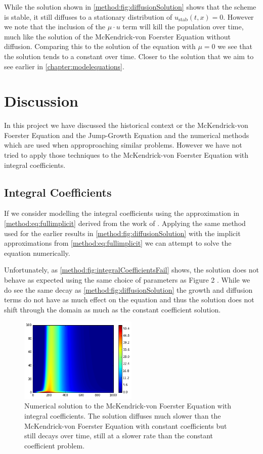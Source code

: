 \documentclass[../main.tex]{subfiles}
\begin{document}
  While the solution shown in \autoref{method:fig:diffusionSolution} shows that the scheme is stable, it still diffuses to a stationary distribution of $u_{\mathrm{stab}}(t, x) = 0$. However we note that the inclusion of the $\mu \cdot u$ term will kill the population over time, much like the solution of the McKendrick-von Foerster Equation without diffusion. Comparing this to the solution of the equation with $\mu = 0$ we see that the solution tends to a constant over time. Closer to the solution that we aim to see earlier in \autoref{chapter:modelequations}.

  \chapter{Discussion}

  In this project we have discussed the historical context or the McKendrick-von Foerster Equation and the Jump-Growth Equation and the numerical methods which are used when approproaching similar problems. However we have not tried to apply those techniques to the McKendrick-von Foerster Equation with integral coefficients.

  \section{Integral Coefficients}
  If we consider modelling the integral coefficients using the approximation in \autoref{method:eq:fullimplicit} derived from the work of \cite{hartvig2011}. Applying the same method used for the earlier results in \autoref{method:fig:diffusionSolution} with the implicit approximations from \autoref{method:eq:fullimplicit} we can attempt to solve the equation numerically.

  Unfortunately, as \autoref{method:fig:integralCoefficientsFail} shows, the solution does not behave as expected using the same choice of parameters as Figure 2 \cite{datta2011}. While we do see the same decay as \autoref{method:fig:diffusionSolution} the growth and diffusion terms do not have as much effect on the equation and thus the solution does not shift through the domain as much as the constant coefficient solution.

  \begin{figure}[htb]
    \centering
    \includegraphics[width=0.5\textwidth]{_assets/integralCoeffsFail.png}
    \caption{\label{method:fig:integralCoefficientsFail} Numerical solution to the McKendrick-von Foerster Equation with integral coefficients. The solution diffuses much slower than the McKendrick-von Foerster Equation with constant coefficients but still decays over time, still at a slower rate than the constant coefficient problem.}
  \end{figure}
\end{document}
